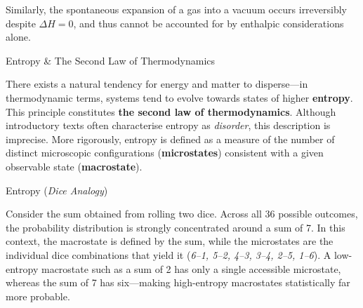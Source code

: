 \documentclass[10pt]{article}
\begin{document}

    Similarly, the spontaneous expansion of a gas into a vacuum occurs irreversibly despite $\Delta H = 0$, and thus cannot be accounted for by enthalpic considerations alone.

    \begin{core}{Entropy \& The Second Law of Thermodynamics}

      There exists a natural tendency for energy and matter to disperse---in thermodynamic terms, systems tend to evolve towards states of higher \textbf{entropy}. This principle constitutes \textbf{the second law of thermodynamics}. Although introductory texts often characterise entropy as \textit{disorder}, this description is imprecise. More rigorously, entropy is defined as a measure of the number of distinct microscopic configurations (\textbf{microstates}) consistent with a given observable state (\textbf{macrostate}).

    \end{core}

    \begin{core}{Entropy (\textit{Dice Analogy})}

      Consider the sum obtained from rolling two dice. Across all 36 possible outcomes, the probability distribution is strongly concentrated around a sum of 7. In this context, the macrostate is defined by the sum, while the microstates are the individual dice combinations that yield it (\textit{6--1, 5--2, 4--3, 3--4, 2--5, 1--6}). A low-entropy macrostate such as a sum of 2 has only a single accessible microstate, whereas the sum of 7 has six---making high-entropy macrostates statistically far more probable.


    \end{core}
\end{document}
